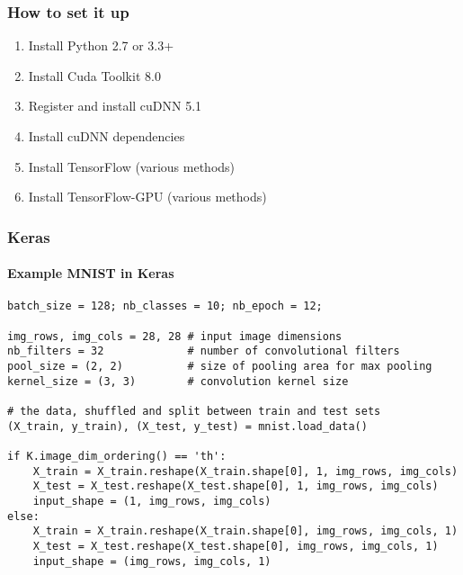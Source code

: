 \documentclass[9pt]{beamer}
\begin{document}
\begin{frame}
\frametitle{How to set it up}
\begin{enumerate}
\item Install Python 2.7 or 3.3+
\item Install Cuda Toolkit 8.0
\item Register and install cuDNN 5.1
\item Install cuDNN dependencies
\item Install TensorFlow (various methods)
\item Install TensorFlow-GPU (various methods)
\end{enumerate}
\end{frame}


\begin{frame}[fragile]
\frametitle{Keras}
\framesubtitle{Example MNIST in Keras}
\lstset{language=Python, breaklines=true, basicstyle=\footnotesize}   
\begin{lstlisting}[frame=single] 
batch_size = 128; nb_classes = 10; nb_epoch = 12;

img_rows, img_cols = 28, 28 # input image dimensions
nb_filters = 32             # number of convolutional filters
pool_size = (2, 2)          # size of pooling area for max pooling
kernel_size = (3, 3)        # convolution kernel size

# the data, shuffled and split between train and test sets
(X_train, y_train), (X_test, y_test) = mnist.load_data()

if K.image_dim_ordering() == 'th':
    X_train = X_train.reshape(X_train.shape[0], 1, img_rows, img_cols)
    X_test = X_test.reshape(X_test.shape[0], 1, img_rows, img_cols)
    input_shape = (1, img_rows, img_cols)
else:
    X_train = X_train.reshape(X_train.shape[0], img_rows, img_cols, 1)
    X_test = X_test.reshape(X_test.shape[0], img_rows, img_cols, 1)
    input_shape = (img_rows, img_cols, 1)
\end{lstlisting}
\end{frame}
\end{document}
